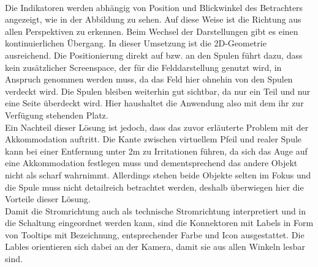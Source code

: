 \vspace{8px}
\begin{center}
	\\
\end{center}
\vspace{6px}

Die Indikatoren werden abhängig von Position und Blickwinkel des Betrachters angezeigt, wie in der Abbildung zu sehen. Auf diese Weise ist die Richtung aus allen Perspektiven zu erkennen. Beim Wechsel der Darstellungen gibt es einen kontinuierlichen Übergang. In dieser Umsetzung ist die 2D-Geometrie ausreichend. Die Positionierung direkt auf bzw. an den Spulen führt dazu, dass kein zusätzlicher Screenspace, der für die Felddarstellung genutzt wird, in Anspruch genommen werden muss, da das Feld hier ohnehin von den Spulen verdeckt wird. Die Spulen bleiben weiterhin gut sichtbar, da nur ein Teil und nur eine Seite überdeckt wird. Hier haushaltet die Anwendung also mit dem ihr zur Verfügung stehenden Platz.\\

Ein Nachteil dieser Lösung ist jedoch, dass das zuvor erläuterte Problem mit der Akkommodation auftritt. Die Kante zwischen virtuellem Pfeil und realer Spule kann bei einer Entfernung unter 2m zu Irritationen führen, da sich das Auge auf eine Akkommodation festlegen muss und dementsprechend das andere Objekt nicht als scharf wahrnimmt. Allerdings stehen beide Objekte selten im Fokus und die Spule muss nicht detailreich betrachtet werden, deshalb überwiegen hier die Vorteile dieser Lösung.\\

Damit die Stromrichtung auch als technische Stromrichtung interpretiert und in die Schaltung eingeordnet werden kann, sind die Konnektoren mit Labels in Form von Tooltips mit Bezeichnung, entsprechender Farbe und Icon ausgestattet. Die Lables orientieren sich dabei an der Kamera, damit sie aus allen Winkeln lesbar sind.\\

